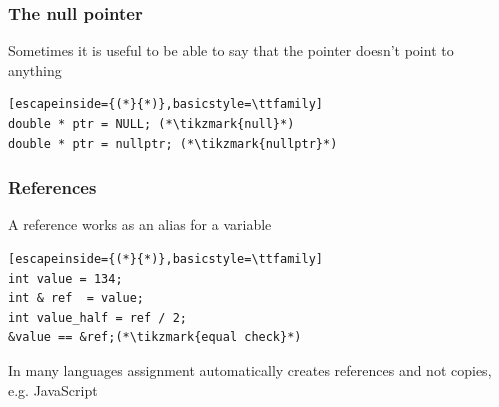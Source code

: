 \documentclass[14pt,a4paper,dvipsnames,usenames]{beamer}
\begin{document}
\begin{frame}[fragile]
  \frametitle{The null pointer}

  Sometimes it is useful to be able to say that the pointer doesn't point to anything

  \vspace{.5cm}
  \begin{lstlisting}[escapeinside={(*}{*)},basicstyle=\ttfamily]
double * ptr = NULL; (*\tikzmark{null}*)
double * ptr = nullptr; (*\tikzmark{nullptr}*)
  \end{lstlisting}

  \nointerlineskip
\end{frame}

\begin{frame}[fragile]
  \frametitle{References}

  A reference works as an alias for a variable

  \vspace{1em}
  \begin{lstlisting}[escapeinside={(*}{*)},basicstyle=\ttfamily]
int value = 134;
int & ref  = value;
int value_half = ref / 2;
&value == &ref;(*\tikzmark{equal check}*)
  \end{lstlisting}

  \vspace{1em}
  In many languages assignment automatically creates references and not copies, e.g. {\color{Tropiteal}JavaScript}

  \nointerlineskip
  
\end{frame}
\end{document}
